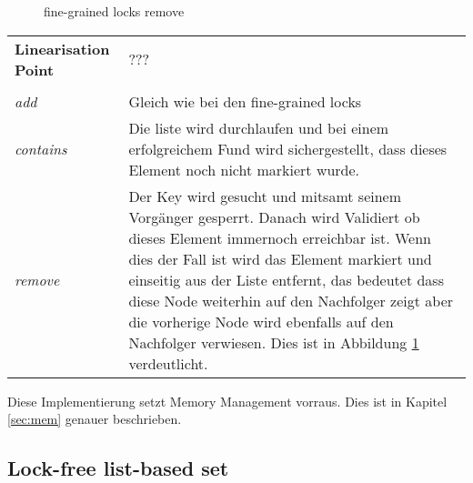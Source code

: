 \begin{figure}[H]
	\centering
	\caption{fine-grained locks remove}
	\label{tik:fine-grained-remove}
\end{figure}

\begin{table}[H]
    \begin{tabularx}{\textwidth}{lX}
        \textbf{Linearisation Point} & ???\\
        \\
        \textit{add} & Gleich wie bei den fine-grained locks\\
        \textit{contains} & Die liste wird durchlaufen und bei einem erfolgreichem Fund wird sichergestellt, dass dieses Element noch nicht markiert wurde. \\
        \textit{remove} & Der Key wird gesucht und mitsamt seinem Vorgänger gesperrt. Danach wird Validiert ob dieses Element immernoch erreichbar ist. Wenn dies der Fall ist wird das Element markiert und einseitig aus der Liste entfernt, das bedeutet dass diese Node weiterhin auf den Nachfolger zeigt aber die vorherige Node wird ebenfalls auf den Nachfolger verwiesen. Dies ist in Abbildung \ref{tik:fine-grained-remove} verdeutlicht.\\
    \end{tabularx}
\end{table}

Diese Implementierung setzt Memory Management vorraus. Dies ist in Kapitel \ref{sec:mem} genauer beschrieben.

\subsection{Lock-free list-based set}

